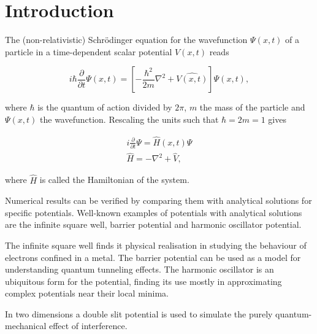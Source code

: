 \section{Introduction}
The (non-relativistic) Schr\"{o}dinger equation for the wavefunction $\Psi(x,t)$ of a particle in a time-dependent scalar potential $V(x,t)$ reads 

\[
i\hbar \frac{\partial}{\partial t}\Psi(x,t) = \left[-\frac{\hbar^2}{2m}\nabla^2+\hat{V(x,t)}\right]\Psi(x,t),
\]

where $\hbar$ is the quantum of action divided by $2\pi$, $m$ the mass of the particle and $\Psi(x,t)$ the wavefunction.
Rescaling the units such that $\hbar = 2m = 1$ gives

\begin{gather*}
i \frac{\partial}{\partial t}\Psi = \hat{H}(x,t)\Psi\\
\hat{H} = -\nabla^2+\hat{V},
\end{gather*}

where $\hat{H}$ is called the Hamiltonian of the system.

Numerical results can be verified by comparing them with analytical solutions for specific potentials. Well-known examples of potentials with analytical solutions are the infinite square well, barrier potential and harmonic oscillator potential.

The infinite square well finds it physical realisation in studying the behaviour of electrons confined in a metal. The barrier potential can be used as a model for understanding quantum tunneling effects. The harmonic oscillator is an ubiquitous form for the potential, finding its use mostly in approximating complex potentials near their local minima.

In two dimensions a double slit potential is used to simulate the purely quantum-mechanical effect of interference.
